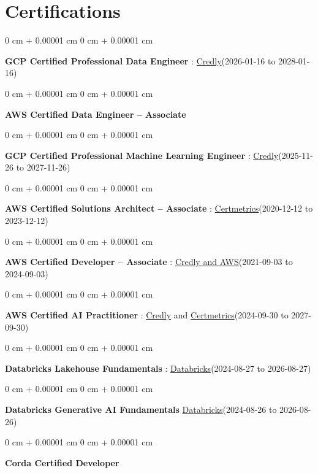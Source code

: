 \documentclass[10pt, letterpaper]{article}
\newenvironment{onecolentry}{
    \begin{adjustwidth}{
        0 cm + 0.00001 cm
    }{
        0 cm + 0.00001 cm
    }
}{
    \end{adjustwidth}
} %
\begin{document}
    \vspace{2 pt }
    \section{Certifications}
        \vspace{2 pt }
        \begin{samepage}
            \begin{onecolentry}
                \textbf{GCP Certified Professional Data Engineer} : \href{https://www.credly.com/badges/977e96d9-12e7-4f6c-b8a7-df71fb7153b8/public_url}{Credly}(2026-01-16 to 2028-01-16)
            \end{onecolentry}
            \begin{onecolentry}
                \textbf{AWS Certified Data Engineer – Associate}
            \end{onecolentry}
            \begin{onecolentry}
                \textbf{GCP Certified Professional Machine Learning Engineer} : \href{https://www.credly.com/badges/a6965347-09ea-4d8f-b398-0e151407160d/public_url}{Credly}(2025-11-26 to 2027-11-26)
            \end{onecolentry}
            \begin{onecolentry}
                \textbf{AWS Certified Solutions Architect – Associate} : \href{https://cp.certmetrics.com/amazon/en/public/verify/credential/SNBY48EBJJVE1SWX}{Certmetrics}(2020-12-12 to 2023-12-12)
            \end{onecolentry}
            \begin{onecolentry}
                \textbf{AWS Certified Developer – Associate} : \href{https://www.credly.com/badges/b8106fbd-d3d1-4204-8cdf-e708798fd582/public_url}{Credly and AWS}(2021-09-03  to 2024-09-03)
            \end{onecolentry}
            \begin{onecolentry}
                \textbf{AWS Certified AI Practitioner} : \href{https://www.credly.com/badges/451b7ba5-8be1-4a8e-bbec-ade26627a6b6/public_url}{Credly} and \href{https://cp.certmetrics.com/amazon/en/public/verify/credential/495f0d9853874bf9a33c17f8e89ce131}{Certmetrics}(2024-09-30 to 2027-09-30)
            \end{onecolentry}
            \begin{onecolentry}
                \textbf{Databricks Lakehouse Fundamentals} : \href{https://scl.io/FXGKS0u}{Databricks}(2024-08-27 to 2026-08-27)
            \end{onecolentry}
            \begin{onecolentry}
                \textbf{Databricks Generative AI Fundamentals} \href{https://sgq.io/3uIFGNi}{Databricks}(2024-08-26 to 2026-08-26)
            \end{onecolentry}
            \begin{onecolentry}
                \textbf{Corda Certified Developer}
            \end{onecolentry}
        \end{samepage}
\end{document}

